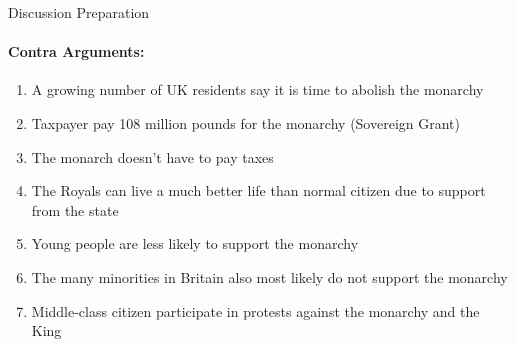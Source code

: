\documentclass[12pt,a4paper]{report}
\begin{document}
	\noindent
	\Large
	Discussion Preparation
	\large
	\paragraph{Contra Arguments:}
	\begin{enumerate}
		\item A growing number of UK residents say it is time to abolish the monarchy
		\item Taxpayer pay 108 million pounds for the monarchy (\dq Sovereign Grant\dq)
		\item The monarch doesn't have to pay taxes
		\item The Royals can live a much better life than normal citizen due to support from the state
		\item Young people are less likely to support the monarchy
		\item The many minorities in Britain also most likely do not support the monarchy 
		\item Middle-class citizen participate in protests against the monarchy and the King
	\end{enumerate}
\end{document}
